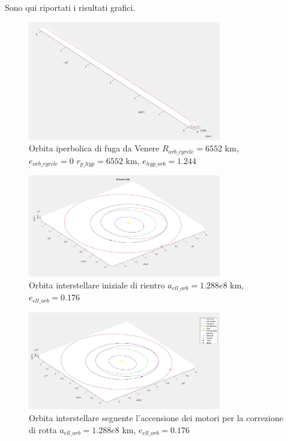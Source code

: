 \documentclass[a4paper]{article}
\begin{document}
Sono qui riportati i risultati grafici.\newline
\begin{figure}[h]
\includegraphics[width=0.75\textwidth]{Exit_venus.png}
\centering
\caption{Orbita iperbolica di fuga da Venere \newline $R_{orb\_cyrcle} = 6552$ km, $e_{orb\_cyrcle} = 0$ \newline $r_{p\_hyp} = 6552$ km, $e_{hyp\_orb} = 1.244$}
\end{figure}
\begin{figure}[h]
\includegraphics[width=0.75\textwidth]{orbita1.png}
\centering
\caption{Orbita interstellare iniziale di rientro \newline $a_{ell\_orb} = 1.288e8$ km, $e_{ell\_orb} = 0.176$}
\end{figure}
\begin{figure}[h]
\includegraphics[width=0.75\textwidth]{orbita2.png}
\centering
\caption{Orbita interstellare seguente l'accensione dei motori per la correzione di rotta \newline $a_{ell\_orb} = 1.288e8$ km, $e_{ell\_orb} = 0.176$}
\end{figure}
\end{document}
